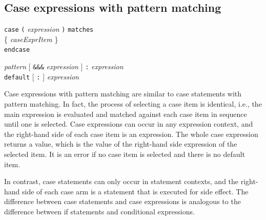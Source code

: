 \documentclass[twoside,letterpaper]{article}
\newcommand{\hm}{\hspace*{1em}}
\newcommand{\hmm}{\hspace*{2em}}
\newcommand{\nterm}[1]{\emph{#1}}
\newcommand{\term}[1]{\texttt{#1}}
\newcommand{\many}[1]{\{ #1 \}}
\newcommand{\opt}[1]{[ #1 ]}
\newcommand{\alt}{{$\mid$}}
\newcommand{\gram}[2]{    \hm\makebox[10em][l]{\it #1}\makebox[1.5em][l]{::=}    #2}
\newcommand{\grammore}[1]{\hm\makebox[10em][l]{      }\makebox[1.5em][l]{}       #1}
\newcommand{\gramalt}[1]{ \hm\makebox[10em][l]{      }\makebox[1.5em][l]{\alt}   #1}
\begin{document}


\subsection{Case expressions with pattern matching}

\label{sec-case-expr}


\gram{caseExpr}{ \term{case} \term{(} \nterm{expression} \term{)} \term{matches} } \\
\grammore      { \hmm \many{ \nterm{caseExprItem} } } \\
\grammore      { \term{endcase} }

\gram{caseExprItem}{ \nterm{pattern}
                      \opt{ \term{\&\&\&} \nterm{expression} }
                      \term{:}
                      \nterm{expression} } \\
\gramalt          { \term{default} \opt{ \term{:} } \nterm{expression} }

Case expressions with pattern matching are similar to case statements
with pattern matching.  In fact, the process of selecting a case item
is identical, i.e., the main expression is evaluated and matched
against each case item in sequence until one is selected.  Case
expressions can occur in any expression context, and the right-hand
side of each case item is an expression.  The whole case expression
returns a value, which is the value of the right-hand side expression
of the selected item.  It is an error if no case item is selected and
there is no default item.

In contrast, case statements can only occur in statement contexts, and
the right-hand side of each case arm is a statement that is executed
for side effect.  The difference between case statements and case
expressions is analogous to the difference between if statements and
conditional expressions.
\end{document}
